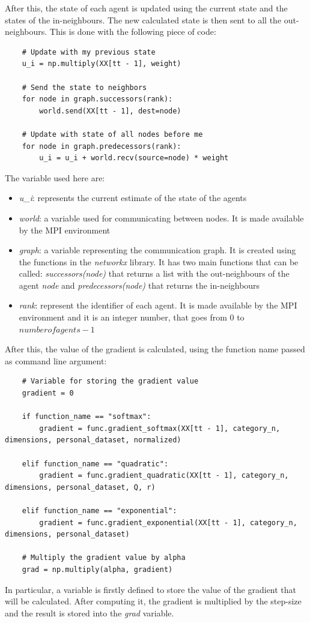 \documentclass[a4paper,11pt,oneside]{book}
\begin{document}
After this, the state of each agent is updated using the current state and the states of the in-neighbours. The new calculated state is then sent to all the out-neighbours. This is done with the following piece of code:
\begin{lstlisting}
    # Update with my previous state
    u_i = np.multiply(XX[tt - 1], weight)

    # Send the state to neighbors
    for node in graph.successors(rank):
        world.send(XX[tt - 1], dest=node)

    # Update with state of all nodes before me
    for node in graph.predecessors(rank):
        u_i = u_i + world.recv(source=node) * weight
\end{lstlisting}

The variable used here are:
\begin{itemize}
	\item  \textit{u\_i}: represents the current estimate of the state of the agents
	\item \textit{world}: a variable used for communicating between nodes. It is made available by the MPI environment
	\item \textit{graph}: a variable representing the communication graph. It is created using the functions in the \textit{networkx} library. It has two main functions that can be called: \textit{successors(node)} that returns a list with the out-neighbours of the agent \textit{node} and \textit{predecessors(node)} that returns the in-neighbours
	\item \textit{rank}: represent the identifier of each agent. It is made available by the MPI environment and it is an integer number, that goes from $0$ to $number of agents - 1$
\end{itemize}

After this, the value of the gradient is calculated, using the function name passed as command line argument:
\begin{lstlisting}
    # Variable for storing the gradient value    
    gradient = 0

    if function_name == "softmax":
        gradient = func.gradient_softmax(XX[tt - 1], category_n, dimensions, personal_dataset, normalized)
	
    elif function_name == "quadratic":
        gradient = func.gradient_quadratic(XX[tt - 1], category_n, dimensions, personal_dataset, Q, r)
	
    elif function_name == "exponential":
        gradient = func.gradient_exponential(XX[tt - 1], category_n, dimensions, personal_dataset)
	
    # Multiply the gradient value by alpha
    grad = np.multiply(alpha, gradient)
\end{lstlisting}
In particular, a variable is firstly defined to store the value of the gradient that will be calculated. After computing it, the gradient is multiplied by the step-size and the result is stored into the \textit{grad} variable. \\
\end{document}
